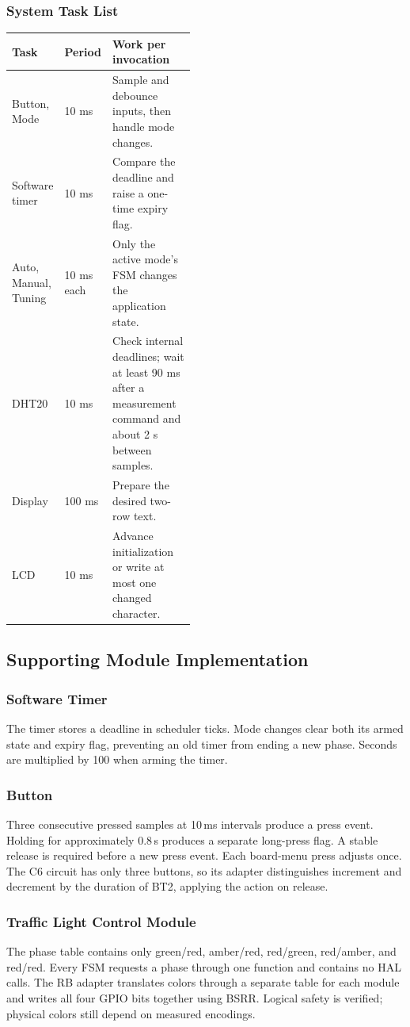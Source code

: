 \subsubsection{System Task List}
\begin{center}
\begin{tabular}{l|l|p{0.46\linewidth}}
Task & Period & Work per invocation\\ \hline
Button, Mode & 10 ms & Sample and debounce inputs, then handle mode changes.\\
Software timer & 10 ms & Compare the deadline and raise a one-time expiry flag.\\
Auto, Manual, Tuning & 10 ms each & Only the active mode's FSM changes the application state.\\
DHT20 & 10 ms & Check internal deadlines; wait at least 90 ms after a measurement command and about 2 s between samples.\\
Display & 100 ms & Prepare the desired two-row text.\\
LCD & 10 ms & Advance initialization or write at most one changed character.\\
\end{tabular}
\end{center}

\subsection{Supporting Module Implementation}
\subsubsection{Software Timer}
The timer stores a deadline in scheduler ticks. Mode changes clear both its armed state and expiry flag, preventing an old timer from ending a new phase. Seconds are multiplied by 100 when arming the timer.

\subsubsection{Button}
Three consecutive pressed samples at 10\,ms intervals produce a press event. Holding for approximately 0.8\,s produces a separate long-press flag. A stable release is required before a new press event. Each board-menu press adjusts once. The C6 circuit has only three buttons, so its adapter distinguishes increment and decrement by the duration of BT2, applying the action on release.

\subsubsection{Traffic Light Control Module}
The phase table contains only green/red, amber/red, red/green, red/amber, and red/red. Every FSM requests a phase through one function and contains no HAL calls. The RB adapter translates colors through a separate table for each module and writes all four GPIO bits together using BSRR. Logical safety is verified; physical colors still depend on measured encodings.

